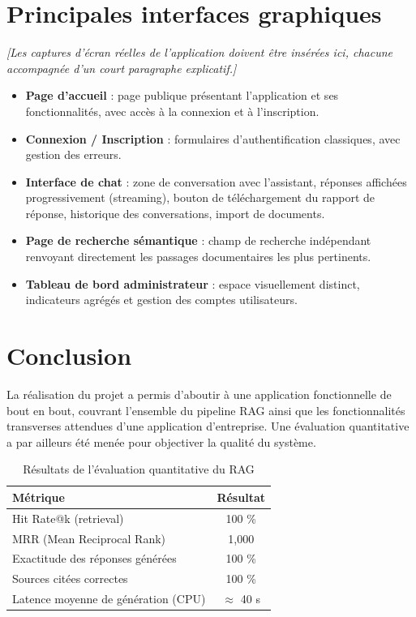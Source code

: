 \documentclass[12pt,a4paper]{report}
\newcommand{\note}[1]{\textit{[#1]}}
\begin{document}
\section{Principales interfaces graphiques}
\note{Les captures d'écran réelles de l'application doivent être insérées ici, chacune accompagnée d'un court paragraphe explicatif.}

\begin{itemize}
  \item \textbf{Page d'accueil} : page publique présentant l'application et ses fonctionnalités, avec accès à la connexion et à l'inscription.
  \item \textbf{Connexion / Inscription} : formulaires d'authentification classiques, avec gestion des erreurs.
  \item \textbf{Interface de chat} : zone de conversation avec l'assistant, réponses affichées progressivement (streaming), bouton de téléchargement du rapport de réponse, historique des conversations, import de documents.
  \item \textbf{Page de recherche sémantique} : champ de recherche indépendant renvoyant directement les passages documentaires les plus pertinents.
  \item \textbf{Tableau de bord administrateur} : espace visuellement distinct, indicateurs agrégés et gestion des comptes utilisateurs.
\end{itemize}

\section{Conclusion}
La réalisation du projet a permis d'aboutir à une application fonctionnelle de bout en bout, couvrant l'ensemble du pipeline RAG ainsi que les fonctionnalités transverses attendues d'une application d'entreprise. Une évaluation quantitative a par ailleurs été menée pour objectiver la qualité du système.

\begin{table}[h]
\centering
\caption{Résultats de l'évaluation quantitative du RAG}
\begin{tabular}{|l|c|}
\hline
\textbf{Métrique} & \textbf{Résultat} \\
\hline
Hit Rate@k (retrieval) & 100 \% \\
MRR (Mean Reciprocal Rank) & 1,000 \\
Exactitude des réponses générées & 100 \% \\
Sources citées correctes & 100 \% \\
Latence moyenne de génération (CPU) & $\approx$ 40 s \\
\hline
\end{tabular}
\end{table}
\end{document}
